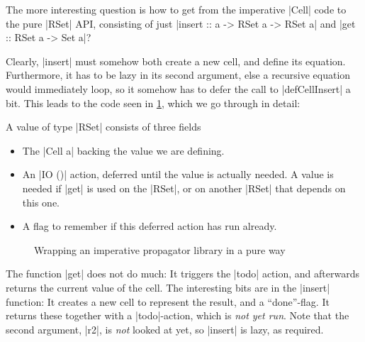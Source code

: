 \documentclass[manuscript,screen,acmsmall,nonacm]{acmart}
\begin{document}
The more interesting question is how to get from the imperative |Cell| code to the pure |RSet| API, consisting of just |insert :: a -> RSet a -> RSet a| and |get :: RSet a -> Set a|?

Clearly, |insert| must somehow both create a new cell, and define its equation.
Furthermore, it has to be lazy in its second argument, else a recursive equation would immediately loop, so it somehow has to defer the call to |defCellInsert| a bit. This leads to the code seen in \cref{fig:wrap}, which we go through in detail:

A value of type |RSet| consists of three fields
\begin{itemize}
\item The |Cell a| backing the value we are defining.
\item An |IO ()| action, deferred until the value is actually needed. A value is needed if |get| is used on the |RSet|, or on another |RSet| that depends on this one.
\item A flag to remember if this deferred action has run already.
\end{itemize}


\begin{figure}%
\setlength{\abovedisplayskip}{0pt}%
\setlength{\belowdisplayskip}{0pt}%
\raggedright%
%
\caption{Wrapping an imperative propagator library in a pure way}\label{fig:wrap}
\end{figure}

The function |get| does not do much: It triggers the |todo| action, and afterwards returns the current value of the cell. The interesting bits are in the |insert| function: It creates a new cell to represent the result, and a “done”-flag. It returns these together with a |todo|-action, which is \emph{not yet run}. Note that the second argument, |r2|, is \emph{not} looked at yet, so |insert| is lazy, as required.
\end{document}
